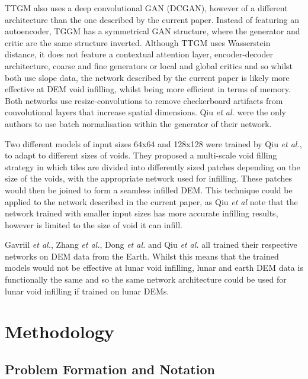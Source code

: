 \documentclass[twocolumn]{article}
\begin{document}
TTGM also uses a deep convolutional GAN (DCGAN), however of a different architecture than the one described by the current paper.
Instead of featuring an autoencoder, TGGM has a symmetrical GAN structure, where the generator and critic are the same structure inverted.
Although TTGM uses Wasserstein distance, it does not feature a contextual attention layer, encoder-decoder architecture, coarse and fine generators or local and global critics and so whilst both use slope data, the network described by the current paper is likely more effective at DEM void infilling, whilst being more efficient in terms of memory.
Both networks use resize-convolutions\autocite{aitkenCheckerboardArtifactFree2017}\autocite{odenaDeconvolutionCheckerboardArtifacts2016} to remove checkerboard artifacts from convolutional layers that increase spatial dimensions.
Qiu \emph{et al.} were the only authors to use batch normalisation within the generator of their network.

Two different models of input sizes 64x64 and 128x128 were trained by Qiu \emph{et al.}, to adapt to different sizes of voids.
They proposed a multi-scale void filling strategy in which tiles are divided into differently sized patches depending on the size of the voids, with the appropriate network used for infilling.
These patches would then be joined to form a seamless infilled DEM.
This technique could be applied to the network described in the current paper, as Qiu \emph{et al} note that the network trained with smaller input sizes has more accurate infilling results, however is limited to the size of void it can infill.

Gavriil \emph{et al.}, Zhang \emph{et al.}, Dong \emph{et al.} and Qiu \emph{et al.} all trained their respective networks on DEM data from the Earth.
Whilst this means that the trained models would not be effective at lunar void infilling, lunar and earth DEM data is functionally the same and so the same network architecture could be used for lunar void infilling if trained on lunar DEMs.


\section{Methodology}
\label{sec:org1d20a3d}

\subsection{Problem Formation and Notation}
\label{sec:org665bea0}
\end{document}
